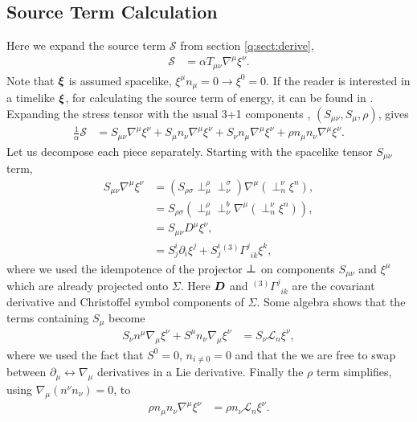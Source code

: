 \subsection{Source Term Calculation} \label{q:sect:source}
Here we expand the source term $\mathcal{S}$ from section \ref{q:sect:derive},
\begin{align}
\mathcal{S} &= \alpha T_{\mu\nu} \nabla^\mu \xi^\nu.
\end{align}
Note that $\boldsymbol{\xi}$ is assumed spacelike, $\xi^\mu n_\mu = 0\rightarrow \xi^0=0$. If the reader is interested in a timelike $\boldsymbol{\xi}$, for calculating the source term of energy, it can be found in \cite{Clough_2021}. Expanding the stress tensor with the usual 3+1 components \cite{gourgoulhon20073+}, \cite{alcubierre2008introduction} $(S_{\mu\nu}, S_{\mu}, \rho)$, gives
\begin{align}
\frac{1}{\alpha}\mathcal{S} &= S_{\mu\nu}\nabla^\mu \xi^\nu + S_\mu n_\nu \nabla^\mu \xi^\nu + S_\nu n_\mu \nabla^\mu \xi^\nu + \rho n_\mu n_\nu\nabla^\mu \xi^\nu.
\end{align}
Let us decompose each piece separately. Starting with the spacelike tensor $S_{\mu\nu}$ term,
\begin{align}
S_{\mu\nu}\nabla^\mu \xi^\nu &= (S_{\rho \sigma}\perp^\rho _\mu \perp^\sigma_\nu )\nabla^\mu ( \perp^\nu_n \xi^n ),  \\
&= S_{\rho \sigma}(\perp^\rho _\mu \perp^b_\nu \nabla^\mu ( \perp^\nu_n \xi^n )),  \\
&= S_{\mu\nu} D^\mu \xi^\nu, \\
&= S^i_{j}\partial_i \xi^j + S^i_{j} {}^{(3)}\Gamma^j_{\,\,\,i k} \xi^k, 
\label{q:eq:S1}
\end{align}
where we used the idempotence of the projector $\boldsymbol{\perp}$ on components $S_{\mu\nu}$ and $\xi^\mu$ which are already projected onto $\Sigma$. Here $\boldsymbol{D}$ and ${}^{(3)}\Gamma^j_{\,\,\,i k}$ are the covariant derivative and Christoffel symbol components of $\Sigma$. Some algebra shows that the terms containing $S_\mu$ become
\begin{align} 
\label{q:eq:S2}S_\nu n^\mu \nabla_\mu \xi^\nu + S^\mu n_\nu \nabla_\mu \xi^\nu  &= S_\nu \mathcal{L}_n \xi^\nu, 
\end{align}
where we used the fact that $S^0 = 0$, $n_{i\neq0}=0$ and that the we are free to swap between $\partial_\mu \leftrightarrow \nabla_\mu$ derivatives in a Lie derivative. Finally the $\rho$ term simplifies, using $\nabla_\mu (n^\nu n_\nu) = 0$, to
\begin{align} \label{q:eq:S3}
\rho n_\mu n_\nu\nabla^\mu \xi^\nu &= \rho n_\nu \mathcal{L}_n \xi^\nu.
\end{align}
